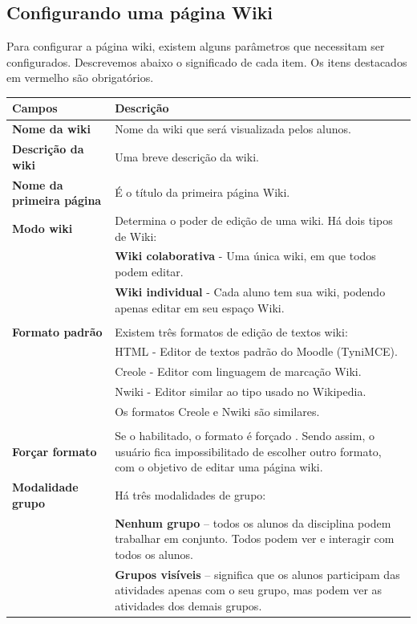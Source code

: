 \subsection{Configurando uma página Wiki}
Para configurar a página wiki, existem alguns parâmetros que necessitam ser configurados. Descrevemos abaixo o significado de cada item. Os itens destacados em vermelho são obrigatórios.

\begin{longtable}{p{6cm}|p{9cm}}
     \hline
     \rowcolor[rgb]{0.8,0.8,0.8} \textbf{Campos} &  \textbf{Descrição}\\\hline
    \textbf{Nome da wiki} & Nome da wiki que será visualizada pelos alunos. \\\hline
    \textbf{Descrição da wiki} &  Uma breve descrição da wiki. \\\hline
    \textbf{Nome da primeira página} &É o título da primeira página Wiki. \\\hline
    \textbf{Modo wiki} & Determina o poder de edição de uma wiki. Há dois tipos de Wiki:\\
&\textbf{ Wiki colaborativa} - Uma única wiki, em que todos podem editar. \\
& \textbf{Wiki individual} - Cada aluno tem sua wiki, podendo apenas editar em seu espaço Wiki. \\
\\\hline
    \textbf{Formato padrão} &  Existem três formatos de edição de textos wiki:\\
&HTML - Editor de textos padrão do Moodle (TyniMCE).\\
&Creole - Editor com linguagem de marcação Wiki.\\
&Nwiki - Editor similar ao tipo usado no Wikipedia.\\
&Os formatos Creole e Nwiki são similares.\\
  \\\hline
    \textbf{Forçar formato} & Se o habilitado, o formato é forçado . Sendo assim, o usuário fica impossibilitado de escolher outro formato, com o objetivo de editar uma página wiki. \\\hline
    \textbf{Modalidade grupo} & Há três modalidades de grupo:\\
&\textbf{Nenhum grupo }– todos os alunos da disciplina podem trabalhar em conjunto. Todos podem ver e interagir com todos os  alunos. \\
&\textbf{Grupos visíveis} – significa que os alunos participam das atividades apenas com o seu grupo, mas podem ver as atividades dos demais grupos.\\

\end{longtable}

